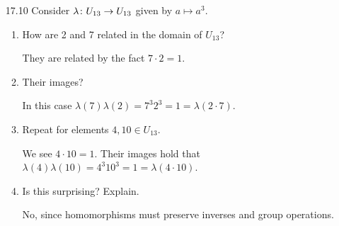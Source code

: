 \documentclass{article}
\begin{document}
\begin{enumerate}[start=0,label={RELABEL}]
  \item[17.10\rparen] Consider $\lambda \colon U_{13} \to U_{13}$ given by $a \mapsto a^{3}$.

        \begin{enumerate}[start=1,label={(\alph*)}]
          \item How are 2 and 7 related in the domain of $U_{13}$?

                They are related by the fact $7 \cdot 2 = 1$.

          \item Their images?

                In this case $\lambda(7) \lambda(2) = 7^{3}2^{3} = 1 = \lambda(2 \cdot 7)$.

          \item Repeat for elements $4, 10 \in U_{13}$.

                We see $4 \cdot 10 = 1$. Their images hold that $\lambda(4)\lambda(10) = 4^{3}10^{3} = 1 = \lambda(4 \cdot 10)$.

          \item Is this surprising? Explain.

                No, since homomorphisms must preserve inverses and group operations.
        \end{enumerate}

\end{enumerate}
\end{document}
